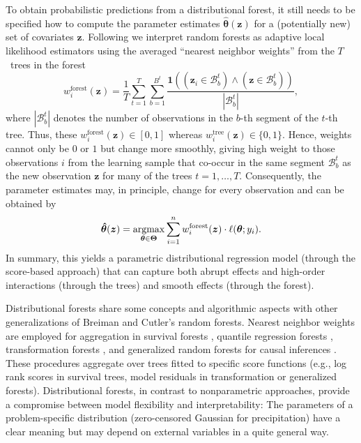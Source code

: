 \documentclass[aoas, preprint]{imsart}
\newcommand{\argmax}{\operatorname{argmax}\displaylimits}
\numberwithin{equation}{subsection}
\begin{document}
To obtain probabilistic predictions from a distributional forest, it still
needs to be specified how to compute the parameter estimates
$\bm{\hat \theta}(\bm{z})$ for a (potentially new) set of covariates $\bm{z}$.
Following \cite{Hothorn+Zeileis:2017} we interpret random forests as adaptive
local likelihood estimators using the averaged ``nearest neighbor weights''
\citep{Lin+Jeon:2006} from the $T$~trees in the forest
\begin{equation}
w^{\text{forest}}_i(\bm{z}) = \frac{1}{T} \sum_{t=1}^T \sum_{b=1}^{B^t}
\frac{\mathbf{1}((\bm{z}_i \in \mathcal{B}^t_b) \land (\bm{z} \in \mathcal{B}^t_b))}{|\mathcal{B}^t_b|},
\end{equation}
where $|\mathcal{B}^t_b|$ denotes the number of observations in the $b$-th
segment of the $t$-th tree.
Thus, these $w^{\text{forest}}_i(\bm{z}) \in [0, 1]$ whereas
$w^{\text{tree}}_i(\bm{z}) \in \{0, 1\}$. Hence, weights cannot only be $0$
or $1$ but change more smoothly, giving high weight to those observations $i$
from the learning sample that co-occur in the same segment $\mathcal{B}_b^t$
as the new observation $\bm{z}$ for many of the trees $t = 1, \dots, T$.
Consequently, the parameter estimates may, in principle, change for every
observation and can be obtained by
\begin{equation}
\bm{\hat \theta}(\bm{z}) =  \argmax_{\bm{\theta} \in \bm{\Theta}} \sum_{i=1}^n w^{\text{forest}}_i(\bm{z}) \cdot \ell(\bm{\theta}; y_i).
\end{equation}
In summary, this yields a parametric distributional regression model 
(through the score-based approach) that can capture both abrupt effects and
high-order interactions (through the trees) and smooth effects (through
the forest).

Distributional forests share some concepts and algorithmic aspects 
with other generalizations of Breiman and Cutler's random forests. Nearest 
neighbor weights are employed for aggregation in survival forests 
\citep{Hothorn+Lausen+Benner:2004},
quantile regression forests \citep{Meinshausen:2006},
transformation forests \citep{Hothorn+Zeileis:2017},
and generalized random forests for causal inferences 
\citep{Athey+Tibshirani+Wager:2017}.
These procedures aggregate over trees fitted to specific score functions 
(e.g., log rank scores in survival trees, model residuals in transformation 
or generalized forests). Distributional forests, in contrast to 
nonparametric approaches, provide a compromise between model flexibility 
and interpretability: The parameters of a problem-specific distribution 
(zero-censored Gaussian for precipitation) have a clear meaning but 
may depend on external variables in a quite general way.
\end{document}
